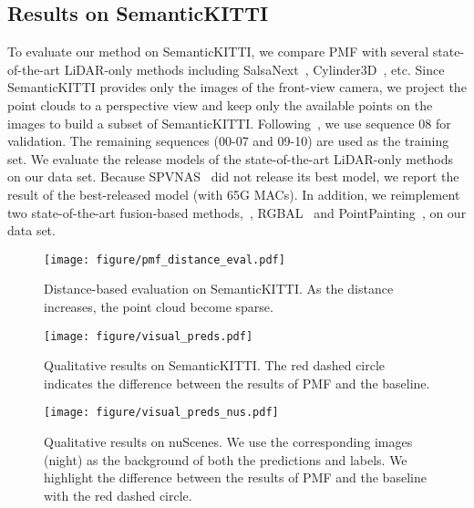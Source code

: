 \documentclass[10pt,twocolumn,letterpaper]{article}
\begin{document}
\subsection{Results on SemanticKITTI}
To evaluate our method on SemanticKITTI, we compare PMF with several state-of-the-art LiDAR-only methods including SalsaNext~\cite{cortinhal2020salsanext}, Cylinder3D~\cite{zhu2021cylindrical}, etc. Since SemanticKITTI provides only the images of the front-view camera, we project the point clouds to a perspective view and keep only the available points on the images to build a subset of SemanticKITTI. Following~\cite{cortinhal2020salsanext,jaritz2020xmuda,zhu2021cylindrical}, we use sequence 08 for validation. The remaining sequences (00-07 and 09-10) are used as the training set. 
We evaluate the release models of the state-of-the-art LiDAR-only methods on our data set. Because SPVNAS~\cite{tang2020searching} did not release its best model, we report the result of the best-released model (with 65G MACs). In addition, we reimplement two state-of-the-art fusion-based methods,~\ie, RGBAL~\cite{Madawy2019RGBAL} and PointPainting~\cite{vora2020pointpainting}, on our data set.
\begin{figure}
\centering
    \texttt{[image: figure/pmf\_distance\_eval.pdf]}
   \caption{Distance-based evaluation on SemanticKITTI. As the distance increases, the point cloud become sparse.} \label{fig:cmp_distance_perf}
\vskip -0.10in
\end{figure}

\begin{figure*}
\centering
    \texttt{[image: figure/visual\_preds.pdf]}
   \caption{Qualitative results on SemanticKITTI. The red dashed circle indicates the difference between the results of PMF and the baseline.}
\label{fig:quality_results}
\end{figure*}

\begin{figure}
   \texttt{[image: figure/visual\_preds\_nus.pdf]}
   \caption{Qualitative results on nuScenes. We use the corresponding images (night) as the background of both the predictions and labels. We highlight the difference between the results of PMF and the baseline with the red dashed circle.}
\label{fig:quality_results_nus}
\end{figure}
\end{document}
